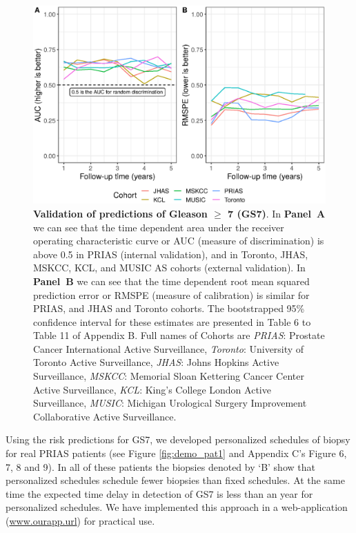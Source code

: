 \begin{figure}
\centerline{\includegraphics[width=\columnwidth]{images/auc_pe.eps}}
\caption{\textbf{Validation of predictions of Gleason $\geq$ 7 (GS7)}. In \textbf{Panel~A} we can see that the time dependent area under the receiver operating characteristic curve or AUC (measure of discrimination) is above 0.5 in PRIAS (internal validation), and in Toronto, JHAS, MSKCC, KCL, and MUSIC AS cohorts (external validation). In \textbf{Panel~B} we can see that the time dependent root mean squared prediction error or RMSPE (measure of calibration) is similar for PRIAS, and JHAS and Toronto cohorts. The bootstrapped 95\% confidence interval for these estimates are presented in Table 6 to Table 11 of Appendix B. Full names of Cohorts are \textit{PRIAS}: Prostate Cancer International Active Surveillance, \textit{Toronto}: University of Toronto Active Surveillance, \textit{JHAS}: Johns Hopkins Active Surveillance, \textit{MSKCC}: Memorial Sloan Kettering Cancer Center Active Surveillance, \textit{KCL}: King's College London Active Surveillance, \textit{MUSIC}: Michigan Urological Surgery Improvement Collaborative Active Surveillance.}
\label{fig:auc_pe}
\end{figure}

Using the risk predictions for GS7, we developed personalized schedules of biopsy for real PRIAS patients (see Figure \ref{fig:demo_pat1} and Appendix C's Figure 6, 7, 8 and 9). In all of these patients the biopsies denoted by `B' show that personalized schedules schedule fewer biopsies than fixed schedules. At the same time the expected time delay in detection of GS7 is less than an year for personalized schedules. We have implemented this approach in a web-application (\url{www.ourapp.url}) for practical use.